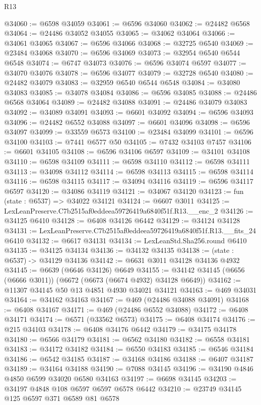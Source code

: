 \begin{lexlean}{R13}
\begin{coremodule}
@34060 := @6598 @34059
@34061 := @6596 @34060
@34062 := @24482 @6568
@34064 := @24486 @34052 @34055
@34065 := @34062 @34064
@34066 := @34061 @34065
@34067 := @6596 @34066
@34068 := @32725 @6540
@34069 := @23484 @34068
@34070 := @6596 @34069
@34073 := @32954 @6540 @6544 @6548
@34074 := @6747 @34073
@34076 := @6596 @34074 @6597
@34077 := @34070 @34076
@34078 := @6596 @34077
@34079 := @32728 @6540
@34080 := @24482 @34079
@34083 := @32959 @6540 @6544 @6548
@34084 := @34080 @34083
@34085 := @34078 @34084
@34086 := @6596 @34085
@34088 := @24486 @6568 @34064
@34089 := @24482 @34088
@34091 := @24486 @34079 @34083
@34092 := @34089 @34091
@34093 := @6601 @34092
@34094 := @6596 @34093
@34096 := @24482 @6552 @34088
@34097 := @6601 @34096
@34098 := @6596 @34097
@34099 := @33559 @6573
@34100 := @23484 @34099
@34101 := @6596 @34100
@34103 := @7441 @6577 @50
@34105 := @7432 @34103 @7457
@34106 := @6601 @34105
@34108 := @6596 @34106 @6597
@34109 := @34101 @34108
@34110 := @6598 @34109
@34111 := @6598 @34110
@34112 := @6598 @34111
@34113 := @34098 @34112
@34114 := @6598 @34113
@34115 := @6598 @34114
@34116 := @6598 @34115
@34117 := @34094 @34116
@34119 := @6596 @34117 @6597
@34120 := @34086 @34119
@34121 := @34067 @34120
@34123 := fun (state : @6537) => @34022 @34121
@34124 := @6607 @3011
@34125 := LexLeanPreserve.C7b2515af0eddeea59726419a6840f51f.R13.__enc_2
@34126 := @34125 @6410
@34128 := @6408 @34126 @6442
@34129 := @34124 @34128
@34131 := LexLeanPreserve.C7b2515af0eddeea59726419a6840f51f.R13.__fits_24 @6410
@34132 := @6617 @34131
@34134 := LexLeanStd.Sha256.round @6410
@34135 := @34125 @34134
@34136 := @34132 @34135
@34138 := (state : @6537) -> @34129 @34136
@34142 := @6631 @3011 @34128 @34136 @4932
@34145 := @6639 (@6646 @34126) @6649
@34155 := @34142 @34145 (@6656 (@6666 @3011)) (@6672 (@6673 (@6674 @4932) @34128 @6649))
@34162 := @11307 @34145 @50 @13 @4851 @4930 @34021 @34121
@34163 := @469 @34031
@34164 := @34162 @34163
@34167 := @469 (@24486 @34088 @34091)
@34168 := @6408 @34167
@34171 := @469 (@24486 @6552 @34088)
@34172 := @6408 @34171
@34174 := @6571 (@33562 @6573)
@34175 := @6408 @34174
@34176 := @215 @34103
@34178 := @6408 @34176 @6442
@34179 := @34175 @34178
@34180 := @6566 @34179
@34181 := @6562 @34180
@34182 := @6558 @34181
@34183 := @34172 @34182
@34184 := @6550 @34183
@34185 := @6546 @34184
@34186 := @6542 @34185
@34187 := @34168 @34186
@34188 := @6407 @34187
@34189 := @34164 @34188
@34190 := @7088 @34145
@34196 := @34190 @4846 @4850 @6599 @34020 @6580 @34163
@34197 := @6698 @34145
@34203 := @34197 @4848 @108 @6597 @6597 @6578 @6442
@34210 := @23749 @34145 @125 @6597 @371 @6589 @81 @6578

\end{coremodule}
\end{lexlean}
